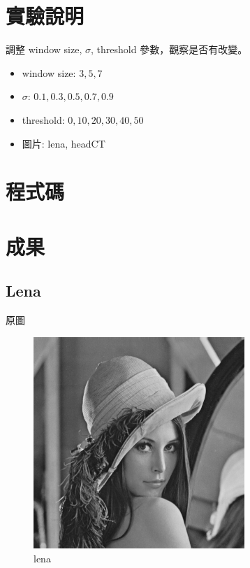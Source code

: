 \documentclass[conference]{IEEEtran}
\begin{document}


\section{實驗說明}
調整 window size, $\sigma$, threshold 參數，觀察是否有改變。

\begin{itemize}
\item window size: $3,5,7$
\item $\sigma$: $0.1,0.3,0.5,0.7,0.9$
\item threshold: $0,10,20,30,40,50$
\item 圖片: lena, headCT 
\end{itemize}

\section{程式碼}


\section{成果}
\subsection{Lena}

原圖

\begin{figure}[H]
\centerline{\includegraphics[width=8cm]{lena.png}}
\caption{lena}
\label{lena}
\end{figure}
\end{document}
